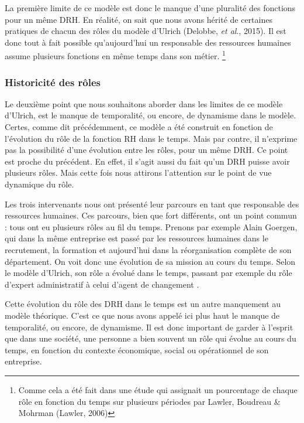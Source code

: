 La première limite de ce modèle est donc le manque d'une pluralité des fonctions pour un même DRH. En réalité, on sait que nous avons hérité de certaines pratiques de chacun des rôles du modèle d'Ulrich (Delobbe, \textit{et al}., 2015). Il est donc tout à fait possible qu'aujourd'hui un responsable des ressources humaines assume plusieurs fonctions en même temps dans son métier.
\footnote{Comme cela a été fait dans une étude qui assignait un pourcentage de chaque rôle en fonction du temps sur plusieurs périodes par Lawler, Boudreau \& Mohrman (Lawler, 2006)}


\subsubsection*{Historicité des rôles}

Le deuxième point que nous souhaitons aborder dans les limites de ce modèle d'Ulrich, est le manque de temporalité, ou encore, de dynamisme dans le modèle. Certes, comme dit précédemment, ce modèle a été construit en fonction de l'évolution du rôle de la fonction RH dans le temps. Mais par contre, il n'exprime pas la possibilité d'une évolution entre les rôles, pour un même DRH. Ce point est proche du précédent. En effet, il s'agit aussi du fait qu'un DRH puisse avoir plusieurs rôles. Mais cette fois nous attirons l'attention sur le point de vue dynamique du rôle. \newline

Les trois intervenants nous ont présenté leur parcours en tant que responsable des ressources humaines. Ces parcours, bien que fort différents, ont un point commun : tous ont eu plusieurs rôles au fil du temps. Prenons par exemple Alain Goergen, qui dans la même entreprise est passé par les ressources humaines dans le recrutement, la formation et aujourd'hui dans la réorganisation complète de son département. On voit donc une évolution de sa mission au cours du temps. Selon le modèle d'Ulrich, son rôle a évolué dans le temps, passant par exemple du rôle d'\og{}expert administratif\fg{} à celui d'\og{}agent de changement \fg{}. \newline 

Cette évolution du rôle des DRH dans le temps est un autre manquement au modèle théorique. C'est ce que nous avons appelé ici plus haut le manque de temporalité, ou encore, de dynamisme. Il est donc important de garder à l'esprit que dans une société, une personne a bien souvent un rôle qui évolue au cours du temps, en fonction du contexte économique, social ou opérationnel de son entreprise. \newline



